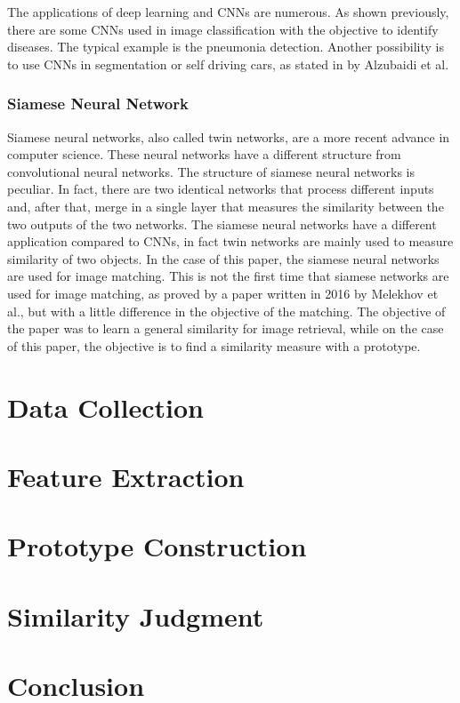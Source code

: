 \documentclass[conference]{IEEEtran}
\begin{document}
				The applications of deep learning and CNNs are numerous. As shown previously, there are some CNNs used in image classification with the objective to identify diseases. The typical example is 
				the pneumonia detection. Another possibility is to use CNNs in segmentation or self driving cars, as stated in \cite{11} by Alzubaidi et al.
		
			\subsubsection{Siamese Neural Network}

				Siamese neural networks, also called twin networks, are a more recent advance in computer science. These neural networks have a different structure from convolutional neural networks. The 
				structure of siamese neural networks is peculiar. In fact, there are two identical networks that process different inputs and, after that, merge in a single layer that measures the similarity between 
				the two outputs of the two networks. The siamese neural networks have a different application compared to CNNs, in fact twin networks are mainly used to measure similarity of two objects. 
				In the case of this paper, the siamese neural networks are used for image matching. This is not the first time that siamese networks are used for image matching, as proved by a paper written in 2016 by 
				Melekhov et al., but with a little difference in the objective of the matching. The objective of the paper was to learn a general similarity for image retrieval, while on the case of this 
				paper, the objective is to find a similarity measure with a prototype. 


\section{Data Collection}
\section{Feature Extraction}
\section{Prototype Construction}
\section{Similarity Judgment}


\section{Conclusion}
\end{document}
